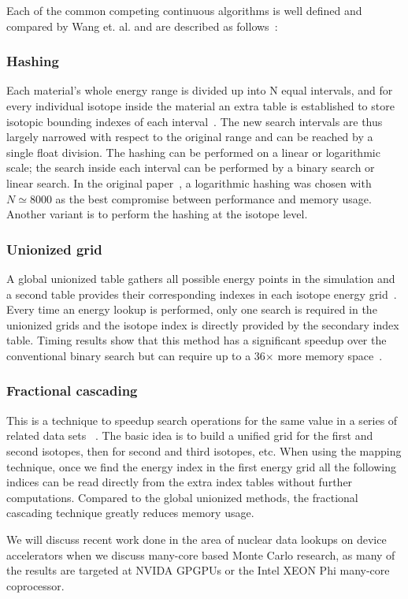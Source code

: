 Each of the common competing continuous algorithms is well defined and compared by Wang et. al. and are described as follows~\cite{wang2016competing}:
%
\subsubsection*{\textbf{Hashing}} Each material's whole energy range is divided up into N equal intervals, and for every individual isotope inside the material an extra table is established to store isotopic bounding indexes of each interval~\cite{brown2014new}. The new search intervals are thus largely narrowed with respect to the original range and can be reached by a single float division. The hashing can be performed on a linear or logarithmic scale; the search inside each interval can be performed by a binary search or linear search. In the original paper~\cite{brown2014new}, a logarithmic hashing was chosen with $ N \simeq 8000 $ as the best compromise between performance and memory usage. Another variant is to perform the hashing at the isotope level.
%
\subsubsection*{\textbf{Unionized grid}} A global unionized table gathers all possible energy points in the simulation and a second table provides their corresponding indexes in each isotope energy grid~\cite{leppanen2009two}. Every time an energy lookup is performed, only one search is required in the unionized grids and the isotope index is directly provided by the secondary index table. Timing results show that this method has a significant speedup over the conventional binary search but can require up to a 36$\times$ more memory space~\cite{a.l.lunda.r.siegel2015}.
%
\subsubsection*{\textbf{Fractional cascading}} This is a technique to speedup search operations for the same value in a series of related data sets ~\cite{a.l.lunda.r.siegel2015}. The basic idea is to build a unified grid for the first and second isotopes, then for second and third isotopes, etc. When using the mapping technique, once we find the energy index in the first energy grid all the following indices can be read directly from the extra index tables without further computations. Compared to the global unionized methods, the fractional cascading technique greatly reduces memory usage.

%
We will discuss recent work done in the area of nuclear data lookups on device accelerators when we discuss many-core based Monte Carlo research, as many of the results are targeted at NVIDA GPGPUs or the Intel XEON Phi many-core coprocessor. 
